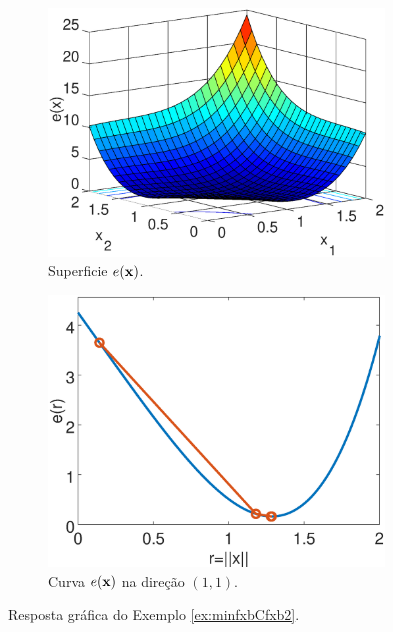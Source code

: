 \begin{figure}[h!]
     \centering
     \begin{subfigure}[b]{0.49\textwidth}
         \centering
         \includegraphics[width=0.98\textwidth]{chapters/minimization-fx/mfiles/fx1/surfcfx2.eps}
         \caption{Superficie $e(\VECTOR{x})$. }
         \label{fig:ex:minfxbCfxb2:a}
     \end{subfigure}
     \hfill
     \begin{subfigure}[b]{0.49\textwidth}
         \centering
         \includegraphics[width=0.98\textwidth]{chapters/minimization-fx/mfiles/fx1/plotfx2.eps}
         \caption{Curva $e(\VECTOR{x})$ na direção $(1,1)$.}
         \label{fig:ex:minfxbCfxb2:b}
     \end{subfigure}
        \caption{Resposta gráfica do Exemplo \ref{ex:minfxbCfxb2}. }
        \label{fig:ex:minfxbCfxb2}
\end{figure}


